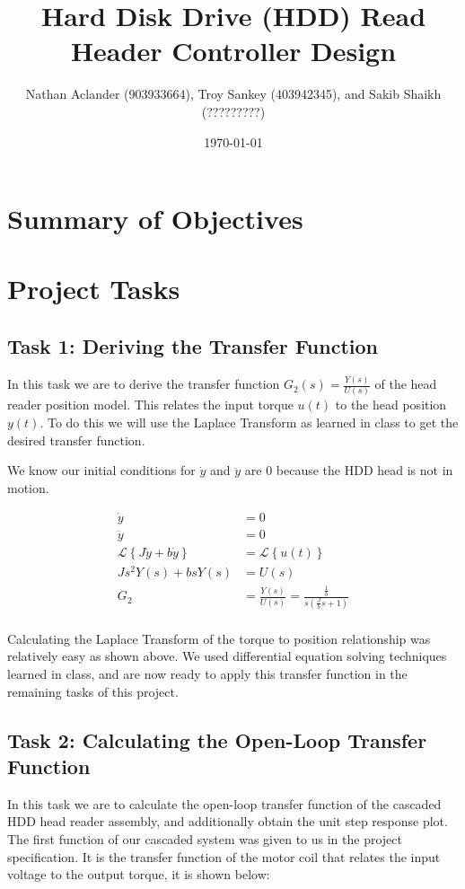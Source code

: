 \documentclass{article}
\title{Hard Disk Drive (HDD) Read Header Controller Design}
\date{\today}
\author{Nathan Aclander (903933664), Troy Sankey (403942345), 
and Sakib Shaikh (?????????)}
\begin{document}
\maketitle
\newpage

\section*{Summary of Objectives}

\section*{Project Tasks}
\subsection*{Task 1: Deriving the Transfer Function}

In this task we are to derive the transfer function $G_2(s) =
\frac{Y(s)}{U(s)}$ of the head reader position model. This relates the
input torque $u(t)$ to the head position $y(t)$. To do this we will
use the Laplace Transform as learned in class to get the desired
transfer function.

We know our initial conditions for $\dot{y}$ and $\ddot{y}$ are $0$
because the HDD head is not in motion.

\begin{align*}
  \dot{y} &= 0 \\
  \ddot{y} &= 0 \\
  \mathcal{L}\left\{ J\ddot{y} + b \dot{y}\right\} &= \mathcal{L}\left\{u(t)\right\} \\
  Js^2 Y(s) + bsY(s) &= U(s) \\
  G_2 &= \frac{Y(s)}{U(s)} = \frac{\frac{1}{b}}{s(\frac{J}{b}s + 1)} \\
\end{align*}

Calculating the Laplace Transform of the torque to position
relationship was relatively easy as shown above. We used differential
equation solving techniques learned in class, and are now ready to
apply this transfer function in the remaining tasks of this project.

\subsection*{Task 2: Calculating the Open-Loop Transfer Function}

In this task we are to calculate the open-loop transfer function of
the cascaded HDD head reader assembly, and additionally obtain the
unit step response plot. The first function of our cascaded system was
given to us in the project specification. It is the transfer function
of the motor coil that relates the input voltage to the output torque,
it is shown below:
\end{document}
